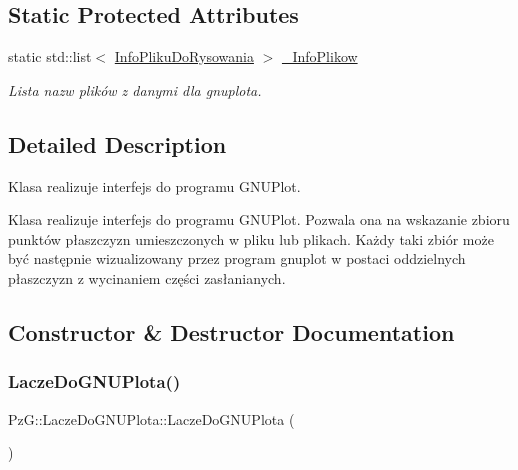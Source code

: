 \subsection*{Static Protected Attributes}
\begin{DoxyCompactItemize}
\item 
static std\+::list$<$ \hyperlink{classPzG_1_1InfoPlikuDoRysowania}{Info\+Pliku\+Do\+Rysowania} $>$ \hyperlink{classPzG_1_1LaczeDoGNUPlota_a1916c5a6fecfb3554e9d5204b2f2086c}{\+\_\+\+Info\+Plikow}
\begin{DoxyCompactList}\small\item\em Lista nazw plików z danymi dla {\itshape gnuplota}. \end{DoxyCompactList}\end{DoxyCompactItemize}


\subsection{Detailed Description}
Klasa realizuje interfejs do programu G\+N\+U\+Plot. 

Klasa realizuje interfejs do programu G\+N\+U\+Plot. Pozwala ona na wskazanie zbioru punktów płaszczyzn umieszczonych w pliku lub plikach. Każdy taki zbiór może być następnie wizualizowany przez program gnuplot w postaci oddzielnych płaszczyzn z wycinaniem części zasłanianych. 

\subsection{Constructor \& Destructor Documentation}
\mbox{\label{classPzG_1_1LaczeDoGNUPlota_a5845189b5ab8c3634acf57024e5deeaf}} 
\subsubsection{\texorpdfstring{Lacze\+Do\+G\+N\+U\+Plota()}{LaczeDoGNUPlota()}}
{\footnotesize\ttfamily Pz\+G\+::\+Lacze\+Do\+G\+N\+U\+Plota\+::\+Lacze\+Do\+G\+N\+U\+Plota (\begin{DoxyParamCaption}{ }\end{DoxyParamCaption})}


